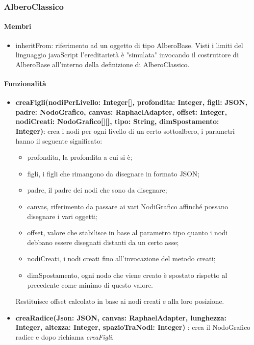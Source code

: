 \subsubsection{AlberoClassico}
\paragraph{Membri}
\begin{itemize}
\item inheritFrom: riferimento ad un oggetto di tipo AlberoBase. Visti i limiti del linguaggio javaScript l'ereditarietà è "simulata" invocando il costruttore di AlberoBase all'interno della definizione di AlberoClassico.
\end{itemize}
\paragraph{Funzionalità}
\begin{itemize}
\item \textbf{creaFigli(nodiPerLivello: Integer[], profondita: Integer, figli: JSON, padre: NodoGrafico, canvas: RaphaelAdapter, offset: Integer, nodiCreati: NodoGrafico[][], tipo: String, dimSpostamento: Integer)}: crea i nodi per ogni livello di un certo sottoalbero, i parametri hanno il seguente significato:
\begin{itemize}
\item profondita, la profondita a cui si è;
\item figli, i figli che rimangono da disegnare in formato JSON;
\item padre, il padre dei nodi che sono da disegnare;
\item canvas, riferimento da passare ai vari NodiGrafico affinché possano disegnare i vari oggetti;
\item offset, valore che stabilisce in base al parametro tipo quanto i nodi debbano essere disegnati distanti da un certo asse;
\item nodiCreati, i nodi creati fino all'invocazione del metodo creati;
\item dimSpostamento, ogni nodo che viene creato è spostato rispetto al precedente come minimo di questo valore.
\end{itemize}
Restituisce offset calcolato in base ai nodi creati e alla loro posizione.
\item \textbf{creaRadice(Json: JSON, canvas: RaphaelAdapter, lunghezza: Integer, altezza: Integer, spazioTraNodi: Integer)} : crea il NodoGrafico radice e dopo richiama \textit{creaFigli}.
\end{itemize}
